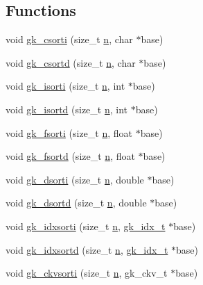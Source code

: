 \subsection*{Functions}
\begin{DoxyCompactItemize}
\item 
void \hyperlink{a00140_a4e3b58cec06398521af35dc21642c97d}{gk\+\_\+csorti} (size\+\_\+t \hyperlink{a00623_a781a04ab095280f838ff3eb0e51312e0}{n}, char $\ast$base)
\item 
void \hyperlink{a00140_a0dd4b6ef6aa36734ad488d600e46aa57}{gk\+\_\+csortd} (size\+\_\+t \hyperlink{a00623_a781a04ab095280f838ff3eb0e51312e0}{n}, char $\ast$base)
\item 
void \hyperlink{a00140_ad434d886936ca951a6694a1d2037bbe3}{gk\+\_\+isorti} (size\+\_\+t \hyperlink{a00623_a781a04ab095280f838ff3eb0e51312e0}{n}, int $\ast$base)
\item 
void \hyperlink{a00140_a0d6536ac92fc1258c8386320dbda99ce}{gk\+\_\+isortd} (size\+\_\+t \hyperlink{a00623_a781a04ab095280f838ff3eb0e51312e0}{n}, int $\ast$base)
\item 
void \hyperlink{a00140_ab149dbe80d68dde0fd497f852233b3d8}{gk\+\_\+fsorti} (size\+\_\+t \hyperlink{a00623_a781a04ab095280f838ff3eb0e51312e0}{n}, float $\ast$base)
\item 
void \hyperlink{a00140_a364e63dcdc210ab135b648daf598313e}{gk\+\_\+fsortd} (size\+\_\+t \hyperlink{a00623_a781a04ab095280f838ff3eb0e51312e0}{n}, float $\ast$base)
\item 
void \hyperlink{a00140_aedce2ad9d9cc3dc07260adb2cf843c62}{gk\+\_\+dsorti} (size\+\_\+t \hyperlink{a00623_a781a04ab095280f838ff3eb0e51312e0}{n}, double $\ast$base)
\item 
void \hyperlink{a00140_afa2696ea8ea8ee66e5c2eb69e9ad4703}{gk\+\_\+dsortd} (size\+\_\+t \hyperlink{a00623_a781a04ab095280f838ff3eb0e51312e0}{n}, double $\ast$base)
\item 
void \hyperlink{a00140_a53b782afd9dd6604c6e8a035c7e1de46}{gk\+\_\+idxsorti} (size\+\_\+t \hyperlink{a00623_a781a04ab095280f838ff3eb0e51312e0}{n}, \hyperlink{a00083_a899f9d8c47b1ca0c2fead41097f4bde2}{gk\+\_\+idx\+\_\+t} $\ast$base)
\item 
void \hyperlink{a00140_a851c55670d9c95d34c588eb086626e6d}{gk\+\_\+idxsortd} (size\+\_\+t \hyperlink{a00623_a781a04ab095280f838ff3eb0e51312e0}{n}, \hyperlink{a00083_a899f9d8c47b1ca0c2fead41097f4bde2}{gk\+\_\+idx\+\_\+t} $\ast$base)
\item 
void \hyperlink{a00140_a174146fc7e90c9afe88d792377916db6}{gk\+\_\+ckvsorti} (size\+\_\+t \hyperlink{a00623_a781a04ab095280f838ff3eb0e51312e0}{n}, gk\+\_\+ckv\+\_\+t $\ast$base)

\end{DoxyCompactItemize}
